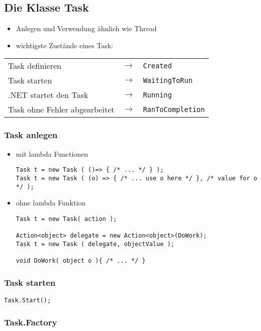 \subsection{Die Klasse Task}

\begin{itemize}
\item Anlegen und Verwendung ähnlich wie Thread
\item wichtigste Zustände eines Task:
\end{itemize}
\begin{tabular}{l l l}
Task definieren &
$\to$ &
\lstinline`Created`\\
Task starten   &
$\to$ &
\lstinline`WaitingToRun`\\
.NET startet den Task &
$\to$ &
\lstinline`Running`\\
Task ohne Fehler abgearbeitet &
$\to$  &
\lstinline`RanToCompletion`\\
\end{tabular}

\subsubsection{Task anlegen}

\begin{itemize}
\item mit lambda Functionen
\begin{lstlisting}[language={[Sharp]C}]
Task t = new Task ( ()=> { /* ... */ } );
Task t = new Task ( (o) => { /* ... use o here */ }, /* value for o */ );
\end{lstlisting}
\item ohne lambda Funktion
\begin{lstlisting}[language={[Sharp]C}]
Task t = new Task( action );

Action<object> delegate = new Action<object>(DoWork);
Task t = new Task ( delegate, objectValue );

void DoWork( object o ){ /* ... */ }
\end{lstlisting}
\end{itemize}

\subsubsection{Task starten}

\lstinline`Task.Start();`

\subsubsection{Task.Factory}

